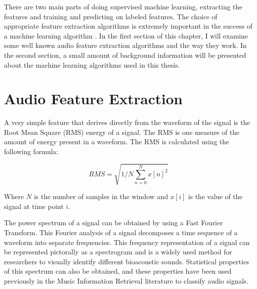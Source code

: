 
\label{chap:analysis}

There are two main parts of doing supervised machine learning,
extracting the features and training and predicting on labeled
features.  The choice of appropriate feature extraction algorithms is
extremely important in the success of a machine learning algorithm
\cite{duda2012pattern}.  In the first section of this chapter, I will
examine some well known audio feature extraction algorithms and the
way they work.  In the second section, a small amount of background
information will be presented about the machine learning algorithms
used in this thesis.

\section{Audio Feature Extraction}


A very simple feature that derives directly from the waveform of the
signal is the Root Mean Square (RMS) energy of a signal.  The RMS is
one measure of the amount of energy present in a waveform.  The RMS is
calculated using the following formula:

\begin{equation} 
RMS =  \sqrt{ 1/N \sum_{n=0}^N x[n]^2 }  
\end{equation}

\noindent Where $N$ is the number of samples in the window and $x[i]$ is the
value of the signal at time point $i$. 

The power spectrum of a signal can be obtained by using a Fast Fourier
Transform.  This Fourier analysis of a signal decomposes a time
sequence of a waveform into separate frequencies.  This frequency
representation of a signal can be represented pictorally as a
spectrogram and is a widely used method for researchers to visually
identify different bioacoustic sounds.  Statistical properties of this
spectrum can also be obtained, and these properties have been used
previously in the Music Information Retrieval literature to classify
audio signals.

